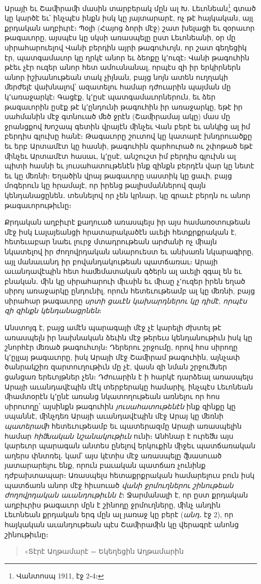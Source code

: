 \documentclass{article}
\begin{document}
{Արայի եւ Շաﬕրաﬕ մասին տարբերակ մըն ալ Խ․ Լեւոնեան\footnote{Վանտոսպ 1911, էջ 2֊4։} գտած կը կարծէ եւ՝ ինչպէս ինքն իսկ կը յայտարարէ, ոչ թէ հայկական, այլ քրդական աղբիւրէ։ Պօլի (Հայոց ձորի մէջ) շատ խելացի եւ զօրաւոր թագաւորը, այսպէս կը սկսի առասպելը ըստ Լեւոնեանի, օր մը սիրահարուելով Վանի բերդին այրի թագուհւոյն, որ շատ գեղեցիկ էր, պատգամաւոր կը ղրկէ անոր եւ ձեոքը կ՚ուզէ։ Վանի թագուհին թէեւ չէր ուզեր անոր հետ ամուսնանալ, որպէս զի իր երկիրներն անոր իշխանութեան տակ չիյնան, բայց նոյն ատեն ուղղակի ﬔրժելէ վախնալով՝ ազատելու համար դժուարին պայման մը կ՚առաջարկէ։ Գացէք, կ՚ըսէ պատգամաւորներուն, եւ ձեր թագաւորին ըսէք թէ կ՚ընդունի թագուհին իր առաջարկը, եթէ իր սահմանին մէջ գտնուած ﬔծ ջրէն (Շաﬕրամայ ակը) մաս մը ջրանցքով Խոշապ գետին վրայէն ﬕնչեւ Վան բերէ եւ անկից ալ իմ բերդիս գլուխը հանէ։ Թագաւորը շուտով կը կատարէ խնդրուածքը եւ երբ Արտամէտ կը հասնի, թագուհին զարհուրած ու շփոթած եթէ ﬕնչեւ Արտամէտ հասաւ, կ՚ըսէ, անշուշտ իմ բերդիս գլուխն ալ պիտի հասնի եւ յուսահատութենէն ինք զինքն բերդէն վար կը նետէ եւ կը ﬔռնի։ Եղածին վրայ թագաւորը սաստիկ կը ցաւի, բայց մոգերուն կը հրամայէ, որ իրենց թալիսմաններով զայն կենդանացընեն․ տեսնելով որ չեն կրնար, կը գրաւէ բերդն ու անոր թագաւորութիւնը։

Քրդական աղբիւրէ քաղուած առասպելս իր այս համառօտութեան մէջ իսկ Լալայեանցի հրատարակածէն աւելի հետքրքրական է, հետեւաբար նաեւ լուրջ մտադրութեան արժանի ոչ ﬕայն նկատելով իր ժողովրդական անարուեստ եւ անխառն նկարագիրը, այլ մանաւանդ իր բովանդակութեան պատճառաւ։ Արայի աւանդավէպին հետ հաﬔմատական գծերն ալ աւելի զգալ են եւ բնական․ ﬕն կը սիրահարուի ﬕւսին եւ ﬕւսը չ՚ուզեր իրեն եղած սիրոյ առաջարկը ընդունիլ, որուն հետեւութեամբ ալ կը ﬔռնի, բայց սիրահար թագաւորը \emph{սրտի ցաւէն կախարդներու կը դիմէ, որպէս զի զինքն կենդանացրնեն}։

Անստոյգ է, բայց ամէն պարագայի մէջ չէ կարելի ժխտել թէ առասպելն իր նախնական ձեւին մէջ թերեւս կենդանութիւն իսկ կը շնորհէր ﬔռած թագուհւոյն։ Դերերու շրջումը, որով հոս սիրողը կ՚ըլլայ թագաւորը, իսկ Արայի մէջ Շաﬕրամ թագուհին, այնչափ ծանրակշիռ զարտուղութիւն մը չէ, վասն զի նման շրջուﬓեր ցանցառ երեւոյթներ չեն։ Դժուարին է ի հարկէ դարձեալ առասպելս Արայի աւանդավէպին մէկ տերբերակը համարիլ, ինչպէս Լեւոնեան ﬕամտօրէն կ՚ընէ առանց նկատողութեան առնելու որ հոս սիրուողը՝ այսինքն թագուհին \emph{յուսահատութենէն} ինք զինքը կը սպաննէ, ﬕնչդեռ Արայի աւանդավէպին մէջ Արայ կը ﬔռնի \emph{պատերաﬕ} հետեւութեամբ եւ պատերազմը Արայի առասպելին համար \emph{հիﬓական նշանակութիւն} ունի։ Անհնար է ուրեﬓ այս կարեւոր պարագան անտես ընելով երկուքին ﬕջեւ պատճառական աղերս փնտռել․ կամ՝ այս կէտիս մէջ առասպելը ﬖասուած յատարարելու ենք, որուն բաւական պատճառ չունինք դժբախտապար։
\clearpage
Առասպելս հետաքրքրական համարելուս բուն իսկ պատճառն անոր մէջ հիւսուած \emph{վանի ջրմուղներու շինութեան ժողովրդական աւանդութիւնն է}։ Ջարմանալի է, որ ըստ քրդական աղբիւրիս թագաւոր մըն է շինողը ջրմուղները, ﬕնչ անդին Լեւոնեան քրդական երգ մըն ալ յառաջ կը բերէ (\emph{անդ․} էջ 2), որ հայկական աւանդութեան պէս Շաﬕրաﬕն կը վերագրէ անոնց շինութիւնը։
\begin{quotation}
\arm
\large
«Տէրէ Աղթամարէ = Եկեղեցին Աղթամարին


\end{quotation}}
\end{document}
